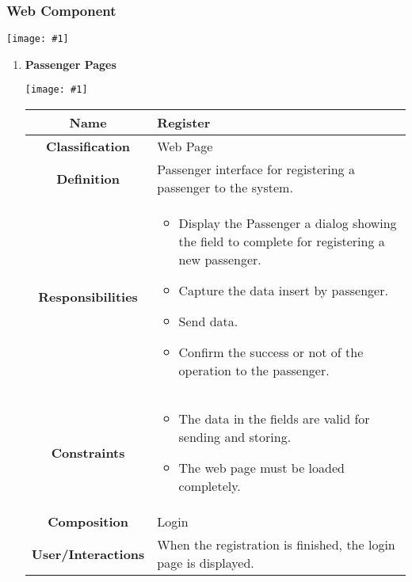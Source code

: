 \documentclass[11pt, a4paper,titlepage]{article}
\newcommand{\image}[1]{
	\begin{center}
		\noindent \texttt{[image: \#1]}
	\end{center}
	}
\begin{document}
\subsubsection{Web Component}
\image{page_component.png}
\newpage
\begin{enumerate}
\item \textbf{Passenger Pages}\\
\image{page_passenger.png}
	\begin{tabularx}{\textwidth}{| c | X |}
		\hline
		\textbf{Name} & 
		Register
		\\
		\hline
		\textbf{Classification} & 
	     Web Page
		\\
		\hline
		\textbf{Definition} & 
		Passenger interface for registering a passenger to the system.\\
		\hline
		\textbf{Responsibilities} &
		\begin{itemize}
			\item Display the Passenger a dialog showing the field to complete for registering a new passenger.
			\item Capture the data insert by passenger.
			\item Send data.
			\item Confirm the success or not of the operation to the passenger.
		\end{itemize}
		\\
		\hline
		\textbf{Constraints} & 
			\begin{itemize}
				\item The data in the fields are valid for sending and storing.
				\item The web page must be loaded completely.
			\end{itemize}
		\\
		\hline
		\textbf{Composition} & 
		Login
		\\
		\hline
		\textbf{User/Interactions} & 
	When the registration is finished, the login page is displayed.
		\\
		\hline	
	\end{tabularx}


\end{enumerate}
\end{document}
